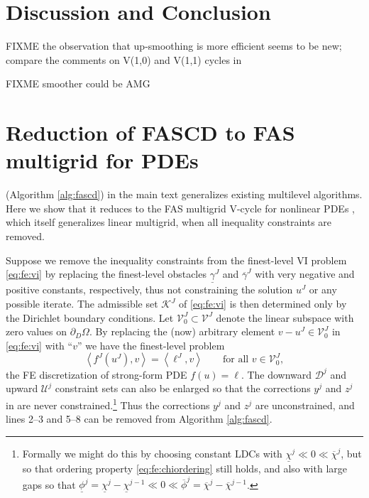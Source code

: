 \documentclass[letterpaper,final,12pt,reqno]{amsart}
\theoremstyle{cstyle}
\theoremstyle{cstyle*}
\theoremstyle{dstyle}
\numberwithin{equation}{section}
\numberwithin{figure}{section}
\numberwithin{table}{section}
\numberwithin{theorem}{section}
\newcommand{\ip}[2]{\left<#1,#2\right>}
\begin{document}


\section{Discussion and Conclusion} \label{sec:discussion}

FIXME the observation that up-smoothing is more efficient seems to be new; compare the comments on V(1,0) and V(1,1) cycles in \cite{GraeserKornhuber2009,Tai2003}

FIXME smoother could be AMG






\appendix
\section{Reduction of FASCD to FAS multigrid for PDEs} \label{app:reductions}

 (Algorithm \ref{alg:fascd}) in the main text generalizes existing multilevel algorithms.  Here we show that it reduces to the FAS multigrid V-cycle for nonlinear PDEs \cite{Trottenbergetal2001}, which itself generalizes linear multigrid, when all inequality constraints are removed.

Suppose we remove the inequality constraints from the finest-level VI problem \eqref{eq:fe:vi} by replacing the finest-level obstacles $\underline{\gamma}^J$ and $\overline{\gamma}^J$ with very negative and positive constants, respectively, thus not constraining the solution $u^J$ or any possible iterate.  The admissible set $\mathcal{K}^J$ of \eqref{eq:fe:vi} is then determined only by the Dirichlet boundary conditions.  Let $\mathcal{V}_0^J \subset \mathcal{V}^J$ denote the linear subspace with zero values on $\partial_D\Omega$.  By replacing the (now) arbitrary element $v-u^J\in\mathcal{V}_0^J$ in \eqref{eq:fe:vi} with ``$v$'' we have the finest-level problem
\begin{equation}
\ip{f^J(u^J)}{v} = \ip{\ell^J}{v} \qquad \text{for all } v\in \mathcal{V}_0^J, \label{eq:app:fas:pde}
\end{equation}
the FE discretization of strong-form PDE $f(u)=\ell$.  The downward $\mathcal{D}^j$ and upward $\mathcal{U}^j$ constraint sets can also be enlarged so that the corrections $y^j$ and $z^j$ in  are never constrained.\footnote{Formally we might do this by choosing constant LDCs with $\underline{\chi}^j \ll 0 \ll \overline{\chi}^j$, but so that ordering property \eqref{eq:fe:chiordering} still holds, and also with large gaps so that $\underline{\phi}^j = \underline{\chi}^j - \underline{\chi}^{j-1} \ll 0 \ll \overline{\phi}^j = \overline{\chi}^j - \overline{\chi}^{j-1}$.}  Thus the corrections $y^j$ and $z^j$ are unconstrained, and lines 2--3 and 5--8 can be removed from Algorithm \ref{alg:fascd}.
\end{document}
